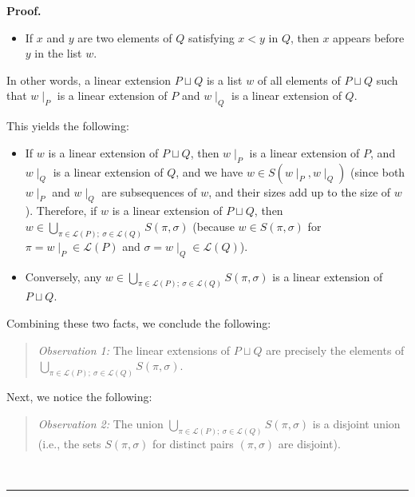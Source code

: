 \documentclass[numbers=enddot,12pt,final,onecolumn,notitlepage]{scrartcl}%
\theoremstyle{definition}
\newenvironment{statement}{\begin{quote}}{\end{quote}}
\newenvironment{proof}[1][Proof]{\noindent\textbf{#1.} }{\ \rule{0.5em}{0.5em}}
\newenvironment{verlong}{}{}
\begin{document}
\begin{verlong}
\begin{proof}
\begin{itemize}
\item If $x$ and $y$ are two elements of $Q$ satisfying $x<y$ in $Q$, then $x$
appears before $y$ in the list $w$.
\end{itemize}

In other words, a linear extension $P\sqcup Q$ is a list $w$ of all elements
of $P\sqcup Q$ such that $w\mid_{P}$ is a linear extension of $P$ and
$w\mid_{Q}$ is a linear extension of $Q$.

This yields the following:

\begin{itemize}
\item If $w$ is a linear extension of $P\sqcup Q$, then $w\mid_{P}$ is a
linear extension of $P$, and $w\mid_{Q}$ is a linear extension of $Q$, and we
have $w\in S\left(  w\mid_{P},w\mid_{Q}\right)  $ (since both $w\mid_{P}$ and
$w\mid_{Q}$ are subsequences of $w$, and their sizes add up to the size of
$w$). Therefore, if $w$ is a linear extension of $P\sqcup Q$, then
$w\in\bigcup_{\pi\in\mathcal{L}\left(  P\right)  ;\ \sigma\in\mathcal{L}%
\left(  Q\right)  }S\left(  \pi,\sigma\right)  $ (because $w\in S\left(
\pi,\sigma\right)  $ for $\pi=w\mid_{P}\in\mathcal{L}\left(  P\right)  $ and
$\sigma=w\mid_{Q}\in\mathcal{L}\left(  Q\right)  $).

\item Conversely, any $w\in\bigcup_{\pi\in\mathcal{L}\left(  P\right)
;\ \sigma\in\mathcal{L}\left(  Q\right)  }S\left(  \pi,\sigma\right)  $ is a
linear extension of $P\sqcup Q$.
\end{itemize}

Combining these two facts, we conclude the following:

\begin{statement}
\textit{Observation 1:} The linear extensions of $P\sqcup Q$ are precisely the
elements of $\bigcup_{\pi\in\mathcal{L}\left(  P\right)  ;\ \sigma
\in\mathcal{L}\left(  Q\right)  }S\left(  \pi,\sigma\right)  $.
\end{statement}

Next, we notice the following:

\begin{statement}
\textit{Observation 2:} The union $\bigcup_{\pi\in\mathcal{L}\left(  P\right)
;\ \sigma\in\mathcal{L}\left(  Q\right)  }S\left(  \pi,\sigma\right)  $ is a
disjoint union (i.e., the sets $S\left(  \pi,\sigma\right)  $ for distinct
pairs $\left(  \pi,\sigma\right)  $ are disjoint).
\end{statement}


\end{proof}
\end{verlong}
\end{document}
